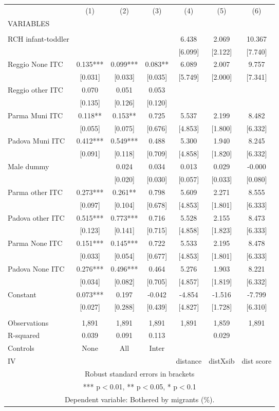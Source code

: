 \begin{tabular}{lcccccc} \hline
 & (1) & (2) & (3) & (4) & (5) & (6) \\
VARIABLES &  &  &  &  &  &  \\ \hline
 &  &  &  &  &  &  \\
RCH infant-toddler &  &  &  & 6.438 & 2.069 & 10.367 \\
 &  &  &  & [6.099] & [2.122] & [7.740] \\
Reggio None ITC & 0.135*** & 0.099*** & 0.083** & 6.089 & 2.007 & 9.757 \\
 & [0.031] & [0.033] & [0.035] & [5.749] & [2.000] & [7.341] \\
Reggio other ITC & 0.070 & 0.051 & 0.053 &  &  &  \\
 & [0.135] & [0.126] & [0.120] &  &  &  \\
Parma Muni ITC & 0.118** & 0.153** & 0.725 & 5.537 & 2.199 & 8.482 \\
 & [0.055] & [0.075] & [0.676] & [4.853] & [1.800] & [6.332] \\
Padova Muni ITC & 0.412*** & 0.549*** & 0.488 & 5.300 & 1.940 & 8.245 \\
 & [0.091] & [0.118] & [0.709] & [4.858] & [1.820] & [6.332] \\
Male dummy &  & 0.024 & 0.034 & 0.013 & 0.029 & -0.000 \\
 &  & [0.020] & [0.030] & [0.057] & [0.033] & [0.080] \\
Parma other ITC & 0.273*** & 0.261** & 0.798 & 5.609 & 2.271 & 8.555 \\
 & [0.097] & [0.104] & [0.678] & [4.853] & [1.801] & [6.333] \\
Padova other ITC & 0.515*** & 0.773*** & 0.716 & 5.528 & 2.155 & 8.473 \\
 & [0.123] & [0.141] & [0.715] & [4.858] & [1.823] & [6.333] \\
Parma None ITC & 0.151*** & 0.145*** & 0.722 & 5.533 & 2.195 & 8.478 \\
 & [0.033] & [0.054] & [0.677] & [4.853] & [1.801] & [6.333] \\
Padova None ITC & 0.276*** & 0.496*** & 0.464 & 5.276 & 1.903 & 8.221 \\
 & [0.034] & [0.082] & [0.705] & [4.857] & [1.819] & [6.332] \\
Constant & 0.073*** & 0.197 & -0.042 & -4.854 & -1.516 & -7.799 \\
 & [0.027] & [0.288] & [0.439] & [4.827] & [1.728] & [6.310] \\
 &  &  &  &  &  &  \\
Observations & 1,891 & 1,891 & 1,891 & 1,891 & 1,859 & 1,891 \\
R-squared & 0.039 & 0.091 & 0.113 &  & 0.029 &  \\
Controls & None & All & Inter &  &  &  \\
 IV &  &  &  & distance & distXsib & dist score \\ \hline
\multicolumn{7}{c}{ Robust standard errors in brackets} \\
\multicolumn{7}{c}{ *** p$<$0.01, ** p$<$0.05, * p$<$0.1} \\
\multicolumn{7}{c}{ Dependent variable: Bothered by migrants (\%).} \\
\end{tabular}
